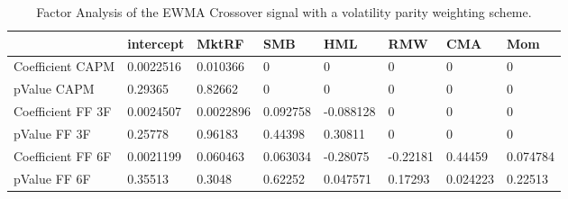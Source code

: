 \begin{table}[H]
\centering
\begin{tabular}{llllllll}
\hline& intercept & MktRF & SMB & HML & RMW & CMA & Mom \\ 
\hline 
Coefficient CAPM & 0.0022516 & 0.010366 & 0 & 0 & 0 & 0 & 0 \\ 
pValue CAPM & 0.29365 & 0.82662 & 0 & 0 & 0 & 0 & 0 \\ 
Coefficient FF 3F & 0.0024507 & 0.0022896 & 0.092758 & -0.088128 & 0 & 0 & 0 \\ 
pValue FF 3F & 0.25778 & 0.96183 & 0.44398 & 0.30811 & 0 & 0 & 0 \\ 
Coefficient FF 6F & 0.0021199 & 0.060463 & 0.063034 & -0.28075 & -0.22181 & 0.44459 & 0.074784 \\ 
pValue FF 6F & 0.35513 & 0.3048 & 0.62252 & 0.047571 & 0.17293 & 0.024223 & 0.22513 \\ 
\hline
\end{tabular}
\caption{Factor Analysis of the EWMA Crossover signal with a volatility parity weighting scheme.}
\label{MBBSVPNR_FACTOR}
\end{table}
